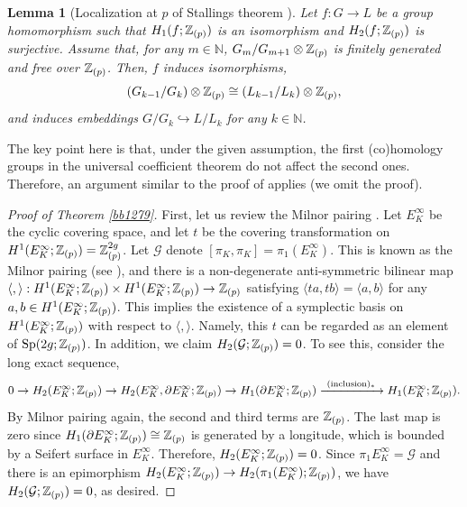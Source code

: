 \documentclass{article}
\theoremstyle{plain}
\newtheorem{lem}[thm]{Lemma}
\theoremstyle{definition}
\newcommand{\ra}{\rightarrow}
\newcommand{\Z}{{\Bbb Z}}
\newcommand{\Sp}{{\rm Sp}}
\begin{document}
{\begin{lem}[{Localization at $p$ of Stallings theorem \cite[Theorem 7.3]{Sta}}]\label{kkk129} Let $f: G \ra L$ be a group homomorphism such that $ H_1(f; \Z_{(p)} )$ is an isomorphism and $ H_2(f; \Z_{(p)})$ is surjective. Assume that, for any $m \in \mathbb{N}$, $ G_m/G_{m+1} \otimes \Z_{(p)}$ is finitely generated and free over $\Z_{(p)}$. Then, $f$ induces isomorphisms,
\[ (G_{k-1}/G_k) \otimes \Z_{(p)} \cong (L_{k-1}/L_k) \otimes \Z_{(p)} ,\] and induces embeddings $ G/G_k \hookrightarrow L/L_k$ for any $k \in \mathbb{N}$.
\end{lem}
\noindent
The key point here is that, under the given assumption, the first (co)homology groups in the universal coefficient theorem do not affect the second ones. Therefore, an argument similar to the proof of \cite[Theorem 7.3]{Sta} applies (we omit the proof).
\begin{proof}
[Proof of Theorem \ref{bb1279}] First, let us review the Milnor pairing \cite{Mil}. Let $E_{K}^{\infty } $ be the cyclic covering space, and let $t$ be the covering transformation on $ H^1(E_{K}^{\infty } ;\Z_{(p)})= \Z_{(p)}^{2g}$. Let $ \mathcal{G}$ denote $ [\pi_K, \pi_K]= \pi_1 (E_{K}^{\infty })$. This is known as the Milnor pairing (see \cite[Assertion 9 and Remark 1]{Mil}), and there is a non-degenerate anti-symmetric bilinear map $ \langle , \rangle : H^1(E_{K}^{\infty } ;\Z_{(p)}) \times H^1(E_{K}^{\infty } ;\Z_{(p)}) \ra \Z_{(p)}$ satisfying $ \langle t a , t b \rangle = \langle a ,b \rangle $ for any $a, b \in H^1(E_{K}^{\infty };\Z_{(p)}) $. This implies the existence of a symplectic basis on $ H^1(E_{K}^{\infty } ;\Z_{(p)})$ with respect to $ \langle , \rangle $. Namely,
this $t $ can be regarded as an element of $\Sp(2g ;\Z_{(p)})$. In addition, we claim $H_2( \mathcal{G};\Z_{(p)})=0$. To see this, consider the long exact sequence,
\[ 0 \ra H_2(E_{K}^{\infty } ;\Z_{(p)}) \ra H_2(E_{K}^{\infty }, \partial E_{K}^{\infty } ;\Z_{(p)})
\ra H_1(\partial E_{K}^{\infty } ;\Z_{(p)}) \xrightarrow{\ (\mathrm{inclusion})_* \ }H_1( E_{K}^{\infty } ;\Z_{(p)}).\]
By Milnor pairing again, the second and third terms are $\Z_{(p)}$. The last map is zero since $H_1(\partial E_{K}^{\infty };\Z_{(p)}) \cong \Z_{(p)}$ is generated by a longitude, which is bounded by a Seifert surface in $E_{K}^{\infty } $. Therefore, $H_2(E_{K}^{\infty } ;\Z_{(p)})=0 $. Since $ \pi_1 E_{K}^{\infty } = \mathcal{G}$ and there is an epimorphism $H_2(E_{K}^{\infty } ;\Z_{(p)}) \ra H_2( \pi_1(E_{K}^{\infty } );\Z_{(p)}) $, we have $H_2( \mathcal{G};\Z_{(p)})=0$, as desired.


\end{proof}}
\end{document}
